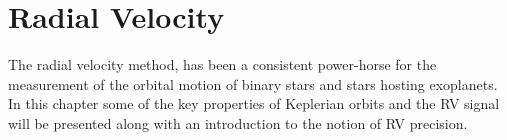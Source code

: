 
\chapter{Radial Velocity}
\label{cha:rv_concepts}

The radial velocity method, has been a consistent power-horse for the measurement of the orbital motion of binary stars and stars hosting exoplanets.
In this chapter some of the key properties of Keplerian orbits and the {RV} signal will be presented along with an introduction to the notion of {RV} precision.




